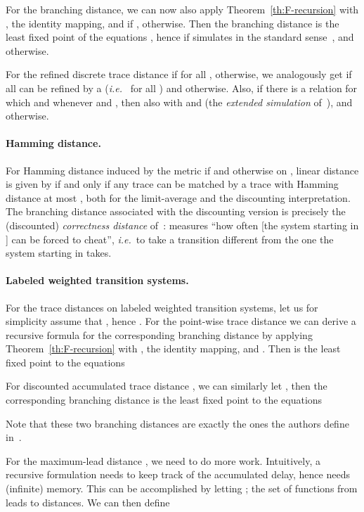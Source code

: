 \documentclass[copyright,creativecommons,sharealike]{eptcs}
\theoremstyle{plain}
\newcommand*\ie{\textit{i.e.}}
\begin{document}
For the branching distance, we can now also apply
Theorem~\ref{th:F-recursion} with ,  the identity
mapping, and  if , 
otherwise.  Then the branching distance is the least fixed point of
the equations , hence  if  simulates  in the standard
sense~\cite{milner89}, and  otherwise.

For the refined discrete trace distance  if
 for all , 
otherwise, we analogously get  if all  can be refined by a  (\ie~ for all ) and  otherwise.  Also,  if there is a relation  for which  and whenever  and , then
also  with  and  (the
\emph{extended simulation} of~\cite{Thomsen87}), and  otherwise.

\paragraph{Hamming distance.}

For Hamming distance induced by the metric  if  and
 otherwise on , linear distance is given by  if and only if any trace  can be matched
by a trace  with Hamming distance at most , both
for the limit-average and the discounting interpretation.  The
branching distance associated with the discounting version is
precisely the (discounted) \emph{correctness distance}
of~\cite{conf/concur/CernyHR10}:  measures ``how often
[the system starting in ] can be forced to cheat'', \ie~to take a
transition different from the one the system starting in  takes.

\paragraph{Labeled weighted transition systems.}

For the trace distances on labeled weighted transition systems, let us
for simplicity assume that , hence .  For the
point-wise trace distance  we can derive a recursive formula for the corresponding
branching distance by applying Theorem~\ref{th:F-recursion} with ,  the identity mapping, and .  Then  is the least fixed point to the equations


For discounted accumulated trace distance , we can similarly let , then the corresponding branching distance is the
least fixed point to the equations

Note that these two branching distances are exactly the ones the
authors define in~\cite{journals/jlap/ThraneFL10}.

For the maximum-lead distance , we need to do
more work.  Intuitively, a recursive formulation needs to keep track
of the accumulated delay, hence needs (infinite) memory.  This can be
accomplished by letting ; the set
of functions from leads to distances.  We can then define
\end{document}
